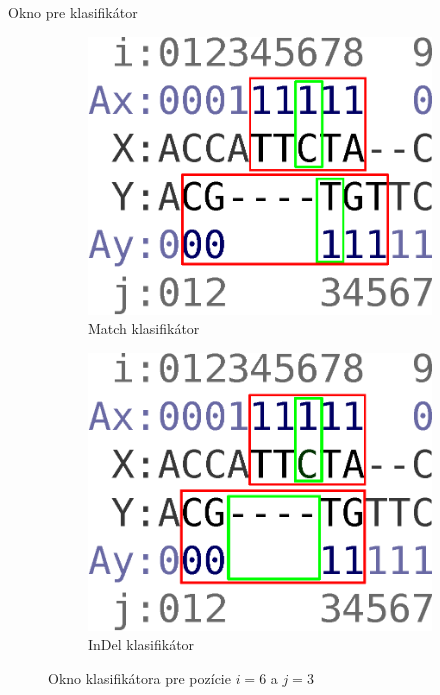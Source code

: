 \documentclass[xcolor=dvipsnames, compress, 12pt]{beamer}
\theoremstyle{definition}
\begin{document}
\begin{frame}{Okno pre klasifikátor}
\begin{figure}[h]
        \centering
        \begin{subfigure}[b]{0.35\textwidth}
                \includegraphics[width=\textwidth]{images/window_m}
                \caption{Match klasifikátor}
                \label{fig:window-m}
        \end{subfigure}%
        \qquad\qquad %
        \begin{subfigure}[b]{0.35\textwidth}
                \includegraphics[width=\textwidth]{images/window_i}
                \caption{InDel klasifikátor}
                \label{fig:window-i}
        \end{subfigure}
        \caption[Okno klasifikátora]{Okno klasifikátora pre pozície $i = 6$ a $j = 3$}
\end{figure}
\end{frame}
\end{document}
